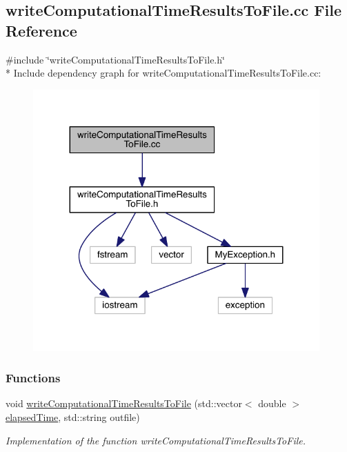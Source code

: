 \hypertarget{a00115}{}\subsection{write\+Computational\+Time\+Results\+To\+File.\+cc File Reference}
\label{a00115}
{\ttfamily \#include \char`\"{}write\+Computational\+Time\+Results\+To\+File.\+h\char`\"{}}\\*
Include dependency graph for write\+Computational\+Time\+Results\+To\+File.\+cc\+:\nopagebreak
\begin{figure}[H]
\begin{center}
\leavevmode
\includegraphics[width=311pt]{a00151}
\end{center}
\end{figure}
\subsubsection*{Functions}
\begin{DoxyCompactItemize}
\item 
void \hyperlink{a00115_a006b80a1f9b722b42b808c5e38565fc7}{write\+Computational\+Time\+Results\+To\+File} (std\+::vector$<$ double $>$ \hyperlink{a00100_aa34a8c2af1a2f3a8758e70eafba9d319}{elapsed\+Time}, std\+::string outfile)
\begin{DoxyCompactList}\small\item\em Implementation of the function write\+Computational\+Time\+Results\+To\+File. \end{DoxyCompactList}\end{DoxyCompactItemize}


